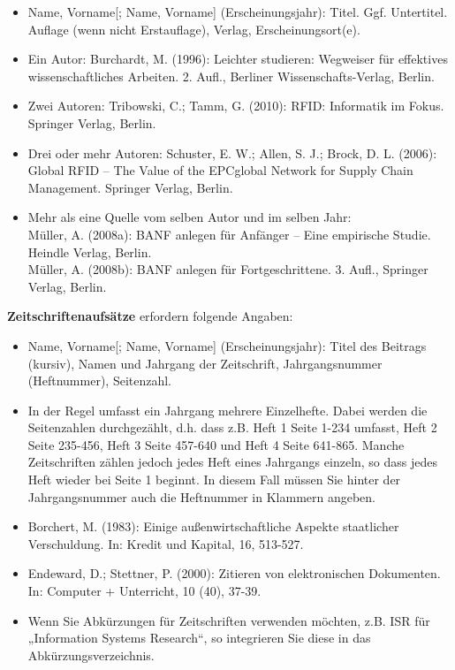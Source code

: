 \documentclass[12pt, oneside]{article}
\begin{document}
\begin{itemize}
    \item Name, Vorname[; Name, Vorname] (Erscheinungsjahr): Titel. Ggf. Untertitel. Auflage (wenn nicht Erstauflage), Verlag, Erscheinungsort(e).
    \item Ein Autor: Burchardt, M. (1996): Leichter studieren: Wegweiser für effektives wissenschaftliches Arbeiten. 2. Aufl., Berliner Wissenschafts-Verlag, Berlin.
    \item Zwei Autoren: Tribowski, C.; Tamm, G. (2010): RFID: Informatik im Fokus. Springer Verlag, Berlin.
    \item Drei oder mehr Autoren: Schuster, E. W.; Allen, S. J.; Brock, D. L. (2006): Global RFID – The Value of the EPCglobal Network for Supply Chain Management. Springer Verlag, Berlin.
    \item Mehr als eine Quelle vom selben Autor und im selben Jahr: \\ Müller, A. (2008a): BANF anlegen für Anfänger – Eine empirische Studie. Heindle Verlag, Berlin. \\
    Müller, A. (2008b): BANF anlegen für Fortgeschrittene. 3. Aufl., Springer Verlag, Berlin.
\end{itemize}
\bigskip
\newpage
\noindent
\textbf{Zeitschriftenaufsätze} erfordern folgende Angaben:
\begin{itemize}
    \item Name, Vorname[; Name, Vorname] (Erscheinungsjahr): Titel des Beitrags (kursiv), Namen und Jahrgang der Zeitschrift, Jahrgangsnummer (Heftnummer), Seitenzahl.
    \item In der Regel umfasst ein Jahrgang mehrere Einzelhefte. Dabei werden die Seitenzahlen durchgezählt, d.h. dass z.B. Heft 1 Seite 1-234 umfasst, Heft 2 Seite 235-456, Heft 3 Seite 457-640 und Heft 4 Seite 641-865. Manche Zeitschriften zählen jedoch jedes Heft eines Jahrgangs einzeln, so dass jedes Heft wieder bei Seite 1 beginnt. In diesem Fall müssen Sie hinter der Jahrgangsnummer auch die Heftnummer in Klammern angeben.
    \item Borchert, M. (1983): Einige außenwirtschaftliche Aspekte staatlicher Verschuldung. In: Kredit und Kapital, 16, 513-527.
    \item Endeward, D.; Stettner, P. (2000): Zitieren von elektronischen Dokumenten. In: Computer + Unterricht, 10 (40), 37-39.
    \item Wenn Sie Abkürzungen für Zeitschriften verwenden möchten, z.B. ISR für „Information Systems Research“, so integrieren Sie diese in das Abkürzungsverzeichnis.
\end{itemize}
\end{document}

